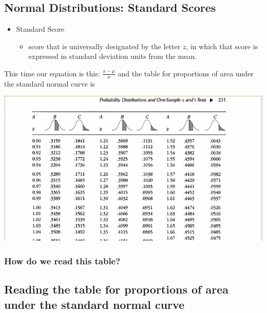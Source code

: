 \documentclass[]{article}
\begin{document}
\subsection{Normal Distributions: Standard
Scores}\label{normal-distributions-standard-scores}

\begin{itemize}
\itemsep1pt\parskip0pt
\item
  Standard Score

  \begin{itemize}
  \itemsep1pt\parskip0pt
  \item
    score that is universally designated by the letter $z$, in which
    that score is expressed in standard deviation units from the mean.
  \end{itemize}
\end{itemize}

This time our equation is this: $\frac{x-\mu}{\sigma}$ and the table for
proportions of area under the standard normal curve is

\includegraphics{ztable.png}

\subsubsection{How do we read this
table?}\label{how-do-we-read-this-table}

\subsection{Reading the table for proportions of area under the standard
normal
curve}\label{reading-the-table-for-proportions-of-area-under-the-standard-normal-curve}
\end{document}

